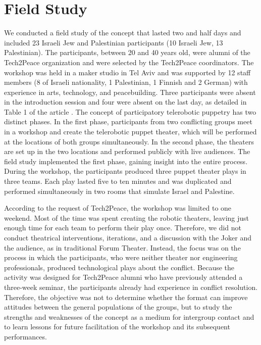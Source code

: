 \documentclass[dissertation,math,vertlayout,pdfa,colorlinks]{aaltoseries}
\begin{document}
\section{Field Study}
We conducted a field study of the concept that lasted two and half days and included 23 Israeli Jew and Palestinian participants (10 Israeli Jew, 13 Palestinian). The participants, between 20 and 40 years old, were alumni of the Tech2Peace organization and were selected by the Tech2Peace coordinators. The workshop was held in a maker studio in Tel Aviv and was supported by 12 staff members (8 of Israeli nationality, 1 Palestinian, 1 Finnish and 2 German) with experience in arts, technology, and peacebuilding. Three participants were absent in the introduction session and four were absent on the last day, as detailed in Table 1 of the article \cite[p. 8]{peledTeleroboticTheaterOppressed2025}. The concept of participatory telerobotic puppetry has two distinct phases. In the first phase, participants from two conflicting groups meet in a workshop and create the telerobotic puppet theater, which will be performed at the locations of both groups simultaneously. In the second phase, the theaters are set up in the two locations and performed publicly with live audiences. The field study implemented the first phase, gaining insight into the entire process. During the workshop, the participants produced three puppet theater plays in three teams. Each play lasted five to ten minutes and was duplicated and performed simultaneously in two rooms that simulate Israel and Palestine.

According to the request of Tech2Peace, the workshop was limited to one weekend. Most of the time was spent creating the robotic theaters, leaving just enough time for each team to perform their play once. Therefore, we did not conduct theatrical interventions, iterations, and a discussion with the Joker and the audience, as in traditional Forum Theater. Instead, the focus was on the process in which the participants, who were neither theater nor engineering professionals, produced technological plays about the conflict. Because the activity was designed for Tech2Peace alumni who have previously attended a three-week seminar, the participants already had experience in conflict resolution. Therefore, the objective was not to determine whether the format can improve attitudes between the general populations of the groups, but to study the strengths and weaknesses of the concept as a medium for intergroup contact and to learn lessons for future facilitation of the workshop and its subsequent performances.
\end{document}
